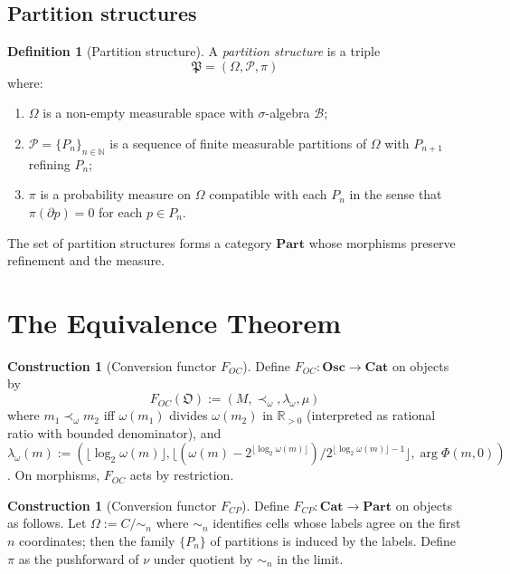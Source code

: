 \documentclass[twocolumn,11pt,a4paper]{article}
\theoremstyle{thmstyle}
\theoremstyle{thmstyle}
\theoremstyle{definition}
\newtheorem{definition}[theorem]{Definition}
\newtheorem{construction}[theorem]{Construction}
\theoremstyle{remark}
\newcommand{\Real}{\mathbb{R}}
\newcommand{\Natural}{\mathbb{N}}
\newcommand{\Osc}{\mathfrak{O}}
\newcommand{\Part}{\mathfrak{P}}
\begin{document}
\subsection{Partition structures}

\begin{definition}[Partition structure]\label{def:part}
A \emph{partition structure} is a triple
\[
\Part = (\Omega, \mathscr{P}, \pi)
\]
where:
\begin{enumerate}[nosep,label=(\roman*)]
\item $\Omega$ is a non-empty measurable space with
      $\sigma$-algebra $\mathscr{B}$;
\item $\mathscr{P} = \{P_{n}\}_{n \in \Natural}$ is
      a sequence of finite measurable partitions of
      $\Omega$ with $P_{n+1}$ refining $P_{n}$;
\item $\pi$ is a probability measure on $\Omega$
      compatible with each $P_{n}$ in the sense that
      $\pi(\partial p) = 0$ for each $p \in P_{n}$.
\end{enumerate}
The set of partition structures forms a category
$\mathbf{Part}$ whose morphisms preserve refinement
and the measure.
\end{definition}

\section{The Equivalence Theorem}
\label{sec:equivalence-theorem}

\begin{construction}[Conversion functor $F_{OC}$]\label{constr:F-OC}
Define $F_{OC} : \mathbf{Osc} \to \mathbf{Cat}$ on
objects by
\[
F_{OC}(\Osc) := (M, \prec_{\omega}, \lambda_{\omega}, \mu)
\]
where $m_{1} \prec_{\omega} m_{2}$ iff $\omega(m_{1})$
divides $\omega(m_{2})$ in $\Real_{>0}$ (interpreted as
rational ratio with bounded denominator), and
$\lambda_{\omega}(m) :=
(\lfloor \log_{2} \omega(m) \rfloor,
 \lfloor (\omega(m) - 2^{\lfloor \log_{2} \omega(m) \rfloor})
        / 2^{\lfloor \log_{2} \omega(m) \rfloor - 1} \rfloor,
 \arg \Phi(m, 0))$.
On morphisms, $F_{OC}$ acts by restriction.
\end{construction}

\begin{construction}[Conversion functor $F_{CP}$]\label{constr:F-CP}
Define $F_{CP} : \mathbf{Cat} \to \mathbf{Part}$ on
objects as follows.  Let $\Omega := C / \sim_{n}$ where
$\sim_{n}$ identifies cells whose labels agree on the
first $n$ coordinates; then the family $\{P_{n}\}$ of
partitions is induced by the labels.  Define
$\pi$ as the pushforward of $\nu$ under quotient by
$\sim_{n}$ in the limit.
\end{construction}
\end{document}
